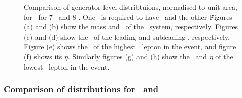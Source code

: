\begin{figure}
{    }
        \vspace{-2mm}
        \vspace{-2mm}
    \caption{\small Comparison of generator level distribtuions, normalised to
    unit area, for \ZZsllll\ for 7
    \tev\ and 8 \tev. One \Z\ is required to have \sstooosZ\ and the other
    \mZgtt\. Figures (a)
    and (b) show the mass and \pt\ of the \ZZ\ system,
    respectively. Figures (c) and (d) show the \pt\ of the
    leading and subleading \Z, respectively. Figure (e) shows the \pt\ of the highest \pt\ lepton in the event, and figure (f) shows its
   $\eta$. Similarly figures (g) and (h) show the \pt\ and $\eta$ of the lowest
   \pt\ lepton in the event.}
    \label{fig:gen-comp-7-8-ZZs}
\end{figure}

\subsubsection{Comparison of distributions for \ggZZ\ and \qqZZ}


